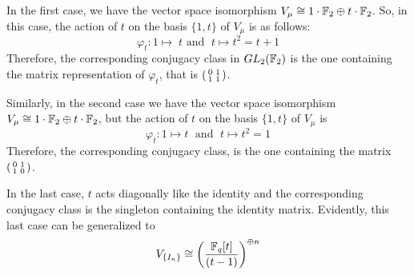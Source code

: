  In the first case, we have the vector space isomorphism $V_\mu\cong 1\cdot\mathbb{F}_2\oplus t\cdot\mathbb{F}_2$. So, in this case, the action of $t$ on the basis $\{1,t\}$ of $V_\mu$ is as follows:
 \begin{equation}
     \varphi_t: 1\mapsto \;t\text{ and }\;t\mapsto t^2=t+1
 \end{equation}
 Therefore, the corresponding conjugacy class in $GL_2(\mathbb{F}_2)$ is the one containing the matrix representation of $\varphi_t$, that is $\begin{psmallmatrix}0&1\\1&1\end{psmallmatrix}$.\par
 Similarly, in the second case we have the vector space isomorphism $V_\mu\cong 1\cdot\mathbb{F}_2\oplus t\cdot\mathbb{F}_2$, but the action of $t$ on the basis $\{1,t\}$ of $V_\mu$ is 
 \begin{equation}
     \varphi_t:1\mapsto t\;\text{ and }\;t\mapsto t^2=1
 \end{equation}
 Therefore, the corresponding conjugacy class, is the one containing the matrix $\begin{psmallmatrix}0&1\\1&0\end{psmallmatrix}$.\par
 In the last case, $t$ acts diagonally like the identity and the corresponding conjugacy class is the singleton containing the identity matrix. Evidently, this last case can be generalized to
        \begin{equation}
            V_{\{I_n\}}\cong \left(\frac{\mathbb{F}_q[t]}{(t-1)}\right)^{\oplus n}
        \end{equation}
